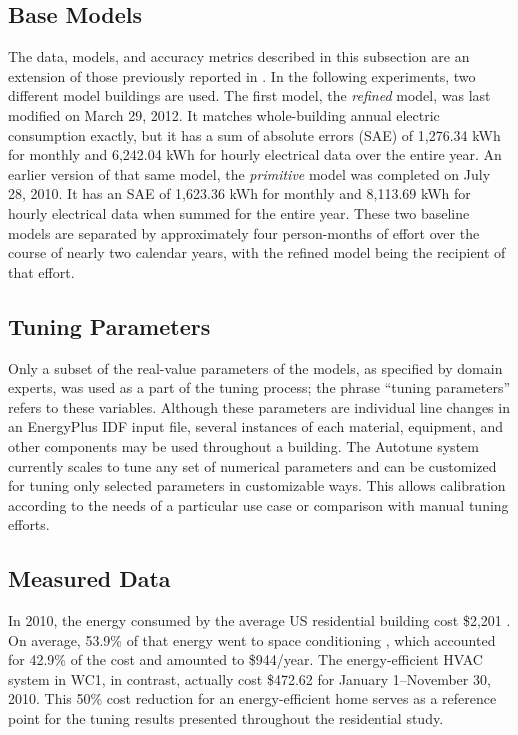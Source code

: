 \documentclass[preprint, review, 12pt]{elsarticle}
\begin{document}
\subsection{Base Models}
The data, models, and accuracy metrics described in this subsection are an extension of those previously reported in \cite{cit:garrett2013}. In the following experiments, two different model buildings are used. The first model, the \emph{refined} model, was last modified on March 29, 2012. It matches whole-building annual electric consumption exactly, but it has a sum of absolute errors (SAE) of 1,276.34 kWh for monthly and 6,242.04 kWh for hourly electrical data over the entire year. An earlier version of that same model, the \emph{primitive} model was completed on July 28, 2010. It has an SAE of 1,623.36 kWh for monthly and 8,113.69 kWh for hourly electrical data when summed for the entire year. These two baseline models are separated by approximately four person-months of effort over the course of nearly two calendar years, with the refined model being the recipient of that effort.

\subsection{Tuning Parameters}
Only a subset of the real-value parameters of the models, as specified by domain experts, was used as a part of the tuning process; the phrase ``tuning parameters'' refers to these variables.%
Although these parameters are individual line changes in an EnergyPlus IDF input file, several instances of each material, equipment, and other components may be used throughout a building. The Autotune system currently scales to tune any set of numerical parameters and can be customized for tuning only selected parameters in customizable ways. This allows calibration according to the needs of a particular use case or comparison with manual tuning efforts.

\subsection{Measured Data}
In 2010, the energy consumed by the average US residential building cost \$2,201 \cite{cit:doe2012a}. On average, 53.9\% of that energy went to space conditioning \cite{cit:doe2012b}, which accounted for 42.9\% of the cost and amounted to \$944/year. The energy-efficient HVAC system in WC1, in contrast, actually cost \$472.62 for January 1--November 30, 2010. This 50\% cost reduction for an energy-efficient home serves as a reference point for the tuning results presented throughout the residential study.
\end{document}
